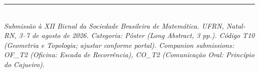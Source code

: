 \documentclass[11pt,a4paper]{article}
\begin{document}
\vspace{0.6em}
\noindent\rule{\linewidth}{0.3pt}\\[0.3em]
\footnotesize
\emph{Submissão à XII Bienal da Sociedade Brasileira de Matemática. UFRN, Natal-RN, 3--7 de agosto de 2026. Categoria: Pôster (Long Abstract, 3 pp.). Código T10 (Geometria e Topologia; ajustar conforme portal). Companion submissions: OF\_T2 (Oficina: Escada de Recorrência), CO\_T2 (Comunicação Oral: Princípio do Cajueiro).}
\end{document}
